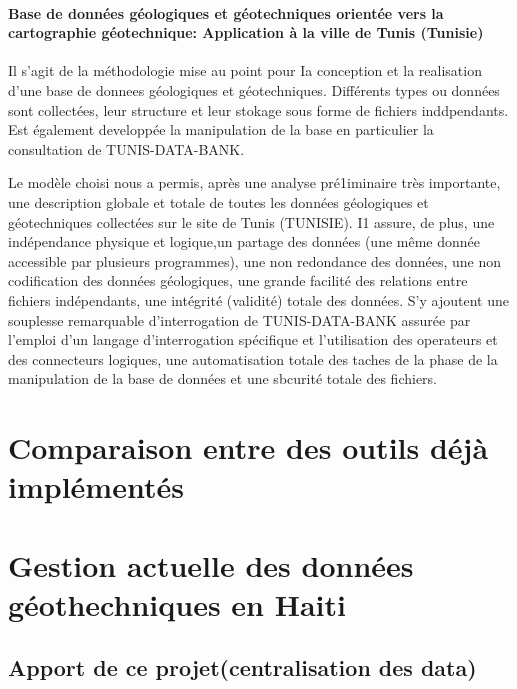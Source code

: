             \paragraph{Base de données géologiques et géotechniques orientée vers la cartographie géotechnique: Application à la ville de Tunis (Tunisie)}
            Il s'agit de la méthodologie mise au point pour Ia conception et la realisation d'une base de donnees géologiques et géotechniques.
            Différents types ou données  sont collectées, leur structure et leur stokage sous forme de fichiers inddpendants. Est également
            developpée la manipulation de la base en particulier la consultation de TUNIS-DATA-BANK.
            \par
            Le modèle choisi nous a permis, après une analyse
pré1iminaire très importante, une description globale et
totale de toutes les données géologiques et géotechniques collectées sur le site de Tunis (TUNISIE). I1
assure, de plus, une indépendance physique et logique,un partage des données (une même donnée accessible  par plusieurs programmes), une non redondance des données, une non codification des
données géologiques, une grande facilité des relations
entre fichiers indépendants, une intégrité (validité)
totale des données. S'y ajoutent une souplesse remarquable d'interrogation de TUNIS-DATA-BANK
assurée par l'emploi d'un langage d'interrogation spécifique et l'utilisation des operateurs et des connecteurs
logiques, une automatisation totale des taches de la
phase de la manipulation de la base de données et une
sbcurité totale des fichiers.
\cite{tunis}
    \section{Comparaison entre des outils déjà implémentés}

    \lipsum[1]
    \section{Gestion actuelle des données géothechniques en Haiti}
    \lipsum[1]
    \subsection{Apport de ce projet(centralisation des data)}
        \lipsum[1]
